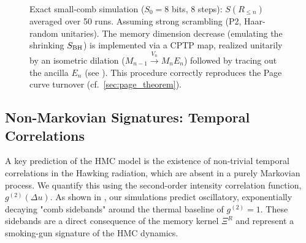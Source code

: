 \documentclass[a4paper,11pt]{article}
\newcommand{\HMC}{\textsc{HMC}\xspace}
\theoremstyle{plain}
\theoremstyle{definition}
\theoremstyle{remark}
\begin{document}
\begin{figure}[htbp]
    \centering
    \caption{Exact small-comb simulation ($S_0=8$ bits, 8 steps): $S(R_{\le n})$ averaged over 50 runs. Assuming strong scrambling (P2, Haar-random unitaries). The memory dimension decrease (emulating the shrinking $S_{\rm BH}$) is implemented via a CPTP map, realized unitarily by an isometric dilation ($M_{n-1}\xrightarrow{V_n} M_n E_n$) followed by tracing out the ancilla $E_n$ (see ). This procedure correctly reproduces the Page curve turnover (cf.~\cref{sec:page_theorem}).}
    \label{fig:page_curve_exact}
\end{figure}

\subsection{Non-Markovian Signatures: Temporal Correlations}
A key prediction of the \HMC{} model is the existence of non-trivial temporal correlations in the Hawking radiation, which are absent in a purely Markovian process. We quantify this using the second-order intensity correlation function, $g^{(2)}(\Delta u)$. As shown in , our simulations predict oscillatory, exponentially decaying "comb sidebands" around the thermal baseline of $g^{(2)}=1$. These sidebands are a direct consequence of the memory kernel $\Xi^R$ and represent a smoking-gun signature of the \HMC{} dynamics.
\end{document}
